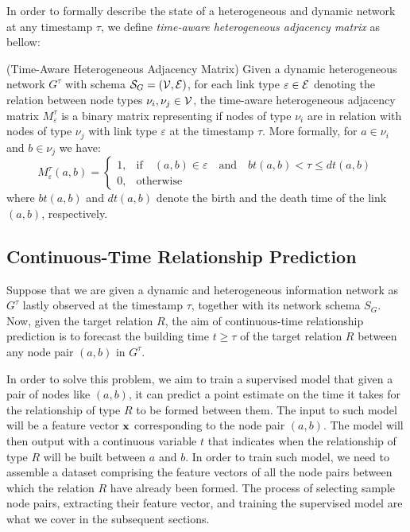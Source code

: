 {\color{red}In order to formally describe the state of a heterogeneous and dynamic network at any timestamp $\tau$, we define \emph{time-aware heterogeneous adjacency matrix} as bellow:
	
	\begin{definition}{(Time-Aware Heterogeneous Adjacency Matrix)}
		Given a dynamic heterogeneous network $G^\tau$ with schema $\mathcal{S}_G=(\mathcal{V}, \mathcal{E})$, for each link type $\varepsilon\in\mathcal{E}$ denoting the relation between node types $\nu_i,\nu_j\in\mathcal{V}$, the time-aware heterogeneous adjacency matrix $M^\tau_{\varepsilon}$ is a binary matrix representing if nodes of type $\nu_i$ are in relation with nodes of type $\nu_j$ with link type $\varepsilon$ at the timestamp $\tau$. More formally, for $a\in\nu_i$ and $b\in\nu_j$ we have:
		\[M^\tau_{\varepsilon}(a,b)=\begin{cases} 
		1, & \text{if}\quad(a,b)\in\varepsilon\quad\text{and}\quad bt(a,b) < \tau \le dt(a,b) \\
		0, & \text{otherwise}
		\end{cases}
		\]
		where $bt(a,b)$ and $dt(a,b)$ denote the birth and the death time of the link $(a,b)$, respectively.
	\end{definition}
}

\subsection{Continuous-Time Relationship Prediction}
Suppose that we are given a dynamic and heterogeneous information network as $G^{\tau}$ lastly observed at the timestamp $\tau$, together with its network schema $S_G$. Now, given the target relation $R$, the aim of continuous-time relationship prediction is to forecast the building time $t\ge \tau$ of the target relation $R$ between any node pair $(a,b)$ in $G^{\tau}$.

{\color{red}
	In order to solve this problem, we aim to train a supervised model that given a pair of nodes like $(a,b)$, it can predict a point estimate on the time it takes for the relationship of type $R$ to be formed between them. The input to such model will be a feature vector $\mathbf{x}$ corresponding to the node pair $(a,b)$. The model will then output with a continuous variable $t$ that indicates when the relationship of type $R$ will be built between $a$ and $b$. In order to train such model, we need to assemble a dataset comprising the feature vectors of all the node pairs between which the relation $R$ have already been formed. The process of selecting sample node pairs, extracting their feature vector, and training the supervised model are what we cover in the subsequent sections. 
}




